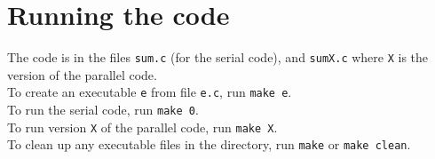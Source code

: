 \documentclass[a4paper]{article}
\newcommand{\nl}{\vspace{0.2cm}\\}
\begin{document}
\section{Running the code}

The code is in the files \texttt{sum.c} (for the serial code), and \texttt{sumX.c} where \texttt{X} is the version of the parallel code.\nl
To create an executable \texttt{e} from file \texttt{e.c}, run \texttt{make e}.\nl
To run the serial code, run \texttt{make 0}.\nl
To run version \texttt{X} of the parallel code, run \texttt{make X}.\nl
To clean up any executable files in the directory, run \texttt{make} or \texttt{make clean}.
\end{document}
